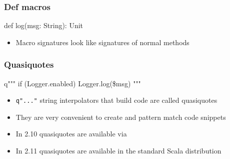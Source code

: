\documentclass[svgnames,hyperref={bookmarks=false}]{beamer}
\begin{document}
\begin{frame}[t, fragile]
\frametitle{Def macros}

\begin{semiverbatim}
\alert{def log(msg: String): Unit}




\end{semiverbatim}

\begin{itemize}
\item Macro signatures look like signatures of normal methods
\end{itemize}
\end{frame}

\begin{frame}[fragile]
\frametitle{Quasiquotes}

\begin{semiverbatim}
q"""
  if (Logger.enabled)
    Logger.log(\$msg)
"""

\end{semiverbatim}

\begin{itemize}
\item \texttt{q"..."} string interpolators that build code are called quasiquotes
\item They are very convenient to create and pattern match code snippets
\item In 2.10 quasiquotes are available via 
\item In 2.11 quasiquotes are available in the standard Scala distribution
\end{itemize}

\end{frame}
\end{document}
